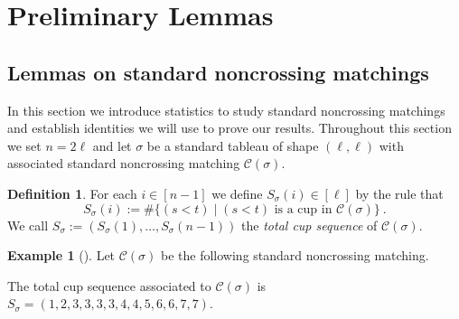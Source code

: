 \documentclass[11pt]{amsart}
\theoremstyle{remark}
\theoremstyle{remark}
\theoremstyle{definition}
\theoremstyle{definition}
\theoremstyle{definition}
\newtheorem{definition}[theorem]{Definition}
\newtheorem{eg_no_qed}[theorem]{Example}
\newenvironment{ex}[1][]{\begin{eg_no_qed}[#1]\renewcommand{\qedsymbol}{$\Diamond$}\pushQED{\qed}}{\popQED\end{eg_no_qed}}
\numberwithin{equation}{section}
\newcommand{\gs}{\sigma}
\newcommand{\cc}{\mathcal{C}}
\newcommand{\cupsigma}{\cc(\gs)}
\begin{document}

\section{Preliminary Lemmas}\label{sec:PreLemms}





\subsection{Lemmas on standard noncrossing matchings}\label{sec:SYTmatchings}

In this section we introduce statistics to study standard noncrossing matchings and establish identities we will use to prove our results. Throughout this section we set $n=2\ell$ and let $\gs$ be a standard tableau of shape $(\ell, \ell)$ with associated standard noncrossing matching $\cupsigma$.

\begin{definition} For each $i\in [n-1]$ we define $S_\gs(i)\in [\ell]$ by the rule that 
\[ 
S_\gs(i) := \# \{(s<t ) \mid \text{$(s<t)$ is a cup in $\cupsigma$} \}\ .
\]
We call  $S_\gs:= (S_\gs(1), \ldots, S_\gs(n-1))$ the \emph{total cup sequence} of $\cupsigma$.
\end{definition}

\begin{ex}\label{ex.totalseq}
Let $\cupsigma$ be the following standard noncrossing matching.
\begin{center}
\end{center} 
The total cup sequence associated to $\cupsigma$ is $S_\gs=\left(1,2,3,3,3,3,4,4,5, 6,6,7,7 \right)$.
\end{ex}
\end{document}
